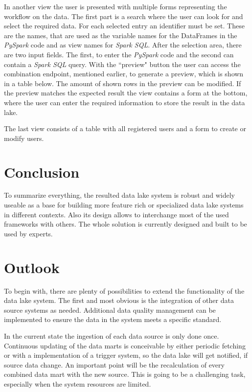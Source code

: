 \documentclass[conference]{IEEEtran}
\begin{document}
In another view the user is presented with multiple forms representing the workflow on the data. 
The first part is a search where the user can look for and select the required data.
For each selected entry an identifier must be set. 
These are the names, that are used as the variable names for the DataFrames in the \textit{PySpark}
code and as view names for \textit{Spark SQL}.
After the selection area, there are two input fields. 
The first, to enter the \textit{PySpark} code and the second can contain a \textit{Spark SQL} query. 
With the ``preview" button the user can access the combination endpoint, mentioned earlier, to 
generate a preview, which is shown in a table below. 
The amount of shown rows in the preview can be modified. 
If the preview matches the expected result the view contains a form at the bottom, where the user 
can enter the required information to store the result in the data lake.

The last view consists of a table with all registered users and a form to create or modify users.

\section{Conclusion}\label{CON}
To summarize everything, the resulted data lake system is robust and widely useable as a base for
building more feature rich or specialized data lake systems in different contexts. 
Also its design allows to interchange most of the used frameworks with others.
The whole solution is currently designed and built to be used by experts. 

\section{Outlook}\label{OUT}
To begin with, there are plenty of possibilities to extend the functionality of the data lake
system. 
The first and most obvious is the integration of other data source systems as needed.
Additional data quality management can be implemented to ensure the data in the system meets a 
specific standard. 

In the current state the ingestion of each data source is only done once. 
Continuous updating of the data marts is conceivable by either periodic fetching or with a 
implementation of a trigger system, so the data lake will get notified, if source data change. 
An important point will be the recalculation of every combined data mart with the new source. 
This is going to be a challenging task, especially when the system resources are limited. 
\end{document}
